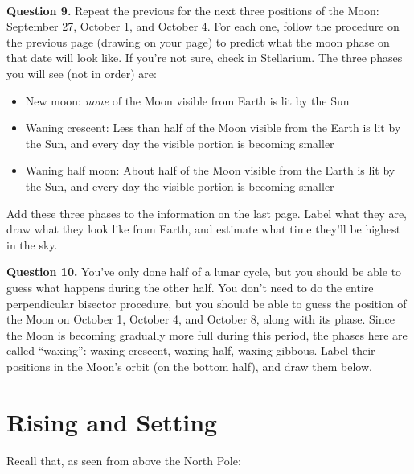 \documentclass[11pt]{article}
\begin{document}
\vspace*{1.5cm}

\hrulefill\\
\newpage

\textbf{Question 9.} Repeat the previous for the next three positions of the Moon: September 27, October 1, and October 4. 
For each one, follow the procedure on the previous page (drawing on your page) to predict what the moon phase on that date will look like.
If you're not sure, check in Stellarium. The three phases you will see (not in order) are:

\begin{itemize}
	\item New moon: {\it none} of the Moon visible from Earth is lit by the Sun
	\item Waning crescent: Less than half of the Moon visible from the Earth is lit by the Sun, and every day the visible portion is becoming smaller
	\item Waning half moon: About half of the Moon visible from the Earth is lit by the Sun, and every day the visible portion is becoming smaller
\end{itemize}

Add these three phases to the information on the last page. Label what they are, draw what they look like from Earth, and 
estimate what time they'll be highest in the sky.

\vspace{1in}

\textbf{Question 10.} You've only done half of a lunar cycle, but you should be able to guess what happens during the other half.
You don't need to do the entire perpendicular bisector procedure, but you should be able to guess the position of the Moon on 
October 1, October 4, and October 8, along with its phase. Since the Moon is becoming gradually more full during this period, 
the phases here are called ``waxing'': waxing crescent, waxing half, waxing gibbous. Label their positions in the Moon's orbit (on the bottom half), and draw them below.

\newpage

\section{Rising and Setting}

Recall that, as seen from above the North Pole:
\end{document}

